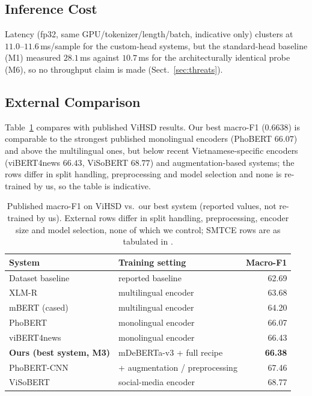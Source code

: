 \subsection{Inference Cost}
Latency (fp32, same GPU/tokenizer/length/batch, indicative only) clusters at
$11.0$--$11.6$\,ms/sample for the custom-head systems, but the standard-head
baseline (M1) measured $28.1$\,ms against $10.7$\,ms for the architecturally
identical probe (M6), so no throughput claim is made (Sect.~\ref{sec:threats}).

\subsection{External Comparison}
\label{sec:external}
Table~\ref{tab:external} compares with published ViHSD results.  Our best
macro-F1 ($0.6638$) is comparable to the strongest published monolingual encoders
(PhoBERT $66.07$) and above the multilingual ones, but below recent
Vietnamese-specific encoders (viBERT4news $66.43$, ViSoBERT $68.77$) and
augmentation-based systems; the rows differ in split handling, preprocessing and
model selection and none is re-trained by us, so the table is indicative.

\begin{table}[t]
\centering
\small
\setlength{\tabcolsep}{4pt}
\caption{Published macro-F1 on ViHSD vs.\ our best system (reported values, not
re-trained by us).  External rows differ in split handling, preprocessing, encoder
size and model selection, none of which we control; SMTCE rows are as tabulated in
\cite{nguyen2022smtce}.}
\label{tab:external}
\begin{tabular}{llr}
\toprule
System & Training setting & Macro-F1 \\
\midrule
Dataset baseline \cite{luu2021vihsd} & reported baseline & 62.69 \\
XLM-R \cite{nguyen2022smtce,conneau2020xlmr} & multilingual encoder & 63.68 \\
mBERT (cased) \cite{nguyen2022smtce} & multilingual encoder & 64.20 \\
PhoBERT \cite{nguyen2022smtce,nguyen2020phobert} & monolingual encoder & 66.07 \\
viBERT4news \cite{nguyen2022smtce} & monolingual encoder & 66.43 \\
\midrule
\textbf{Ours (best system, M3)} & mDeBERTa-v3 + full recipe & \textbf{66.38} \\
PhoBERT-CNN \cite{tran2022phobertcnn} & + augmentation / preprocessing & 67.46 \\
ViSoBERT \cite{nguyen2023visobert} & social-media encoder & 68.77 \\
\bottomrule
\end{tabular}
\end{table}
